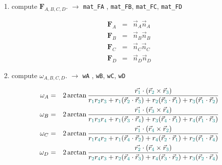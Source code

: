 \begin{enumerate}
\item compute ${\bm F}_{A,B,C,D}$. 
$\rightarrow$ \verb|mat_FA| , \verb|mat_FB|, \verb|mat_FC|, 
\verb|mat_FD|

\begin{eqnarray}
{\bm F}_A &=& \vec{n}_A\vec{n}_A \\
{\bm F}_B &=& \vec{n}_B\vec{n}_B \\
{\bm F}_C &=& \vec{n}_C\vec{n}_C \\
{\bm F}_D &=& \vec{n}_D\vec{n}_D 
\end{eqnarray}

\item compute $\omega_{A,B,C,D}$. $\rightarrow$ \verb|wA| , \verb|wB|, \verb|wC|, \verb|wD|

\begin{eqnarray}
\omega_A &=& 
2 \arctan \frac{\vec{r_{\color{teal}1}} \cdot (\vec{r}_{\color{teal}2} \times \vec{r}_{\color{teal}3})}{r_{\color{teal}1}r_{\color{teal}2}r_{\color{teal}3} 
+{r}_{\color{teal}1}(\vec{r}_{\color{teal}2}\cdot\vec{r}_{\color{teal}3}) 
+{r}_{\color{teal}2}(\vec{r}_{\color{teal}3}\cdot\vec{r}_{\color{teal}1}) 
+{r}_{\color{teal}3}(\vec{r}_{\color{teal}1}\cdot\vec{r}_{\color{teal}2})  } \nonumber\\
\omega_B &=& 
2 \arctan \frac{\vec{r_{\color{teal}1}} \cdot (\vec{r}_{\color{teal}3} \times \vec{r}_{\color{teal}4})}{r_{\color{teal}1}r_{\color{teal}3}r_{\color{teal}4} 
+r_{\color{teal}1}(\vec{r}_{\color{teal}3}\cdot\vec{r}_{\color{teal}4}) 
+r_{\color{teal}3}(\vec{r}_{\color{teal}4}\cdot\vec{r}_{\color{teal}1}) 
+r_{\color{teal}4}(\vec{r}_{\color{teal}1}\cdot\vec{r}_{\color{teal}3})  } \nonumber\\
\omega_C &=&
2 \arctan \frac{\vec{r_{\color{teal}1}} \cdot (\vec{r}_{\color{teal}4} \times \vec{r}_{\color{teal}2})}{r_{\color{teal}1}r_{\color{teal}4}r_{\color{teal}2}
+r_{\color{teal}1}(\vec{r}_{\color{teal}4}\cdot\vec{r}_{\color{teal}2}) 
+r_{\color{teal}4}(\vec{r}_{\color{teal}2}\cdot\vec{r}_{\color{teal}1}) 
+r_{\color{teal}2}(\vec{r}_{\color{teal}1}\cdot\vec{r}_{\color{teal}4}) 
} \nonumber\\
\omega_D &=&
2 \arctan \frac{\vec{r_{\color{teal}2}} \cdot (\vec{r}_{\color{teal}4} \times \vec{r}_{\color{teal}3})}{r_{\color{teal}2}r_{\color{teal}4}r_{\color{teal}3} 
+r_{\color{teal}2}(\vec{r}_{\color{teal}4}\cdot\vec{r}_{\color{teal}3}) 
+r_{\color{teal}4}(\vec{r}_{\color{teal}3}\cdot\vec{r}_{\color{teal}2}) 
+r_{\color{teal}3}(\vec{r}_{\color{teal}2}\cdot\vec{r}_{\color{teal}4}) 
}
\end{eqnarray}


\end{enumerate}
